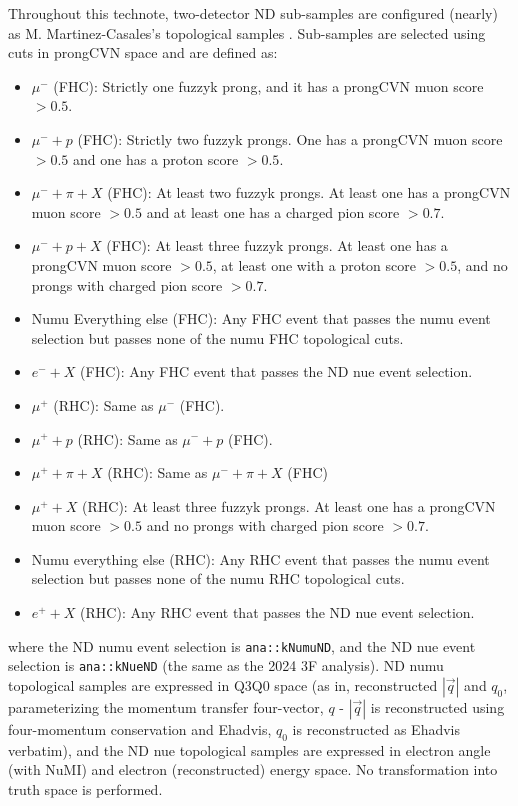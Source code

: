 \documentclass{article}
\begin{document}
Throughout this technote, two-detector ND sub-samples are configured (nearly) as M. Martinez-Casales's topological samples \cite{ref:maria_thesis} \cite{ref:topological_samples_technote}. Sub-samples are selected using cuts in prongCVN space and are defined as:
\begin{itemize}
  \item $\mu^-$ (FHC): Strictly one fuzzyk prong, and it has a prongCVN muon score $> 0.5$.
  \item $\mu^- + p$ (FHC): Strictly two fuzzyk prongs. One has a prongCVN muon score $> 0.5$ and one has a proton score $> 0.5$.
  \item $\mu^- + \pi + X$ (FHC): At least two fuzzyk prongs. At least one has a prongCVN muon score $>0.5$ and at least one has a charged pion score $> 0.7$.
  \item $\mu^- + p + X$ (FHC): At least three fuzzyk prongs. At least one has a prongCVN muon score $>0.5$, at least one with a proton score $> 0.5$, and no prongs with charged pion score $>0.7$.
  \item Numu Everything else (FHC): Any FHC event that passes the numu event selection but passes none of the numu FHC topological cuts.
  \item $e^- + X$ (FHC): Any FHC event that passes the ND nue event selection.
  \item $\mu^+$ (RHC): Same as $\mu^-$ (FHC).
  \item $\mu^+ + p$ (RHC): Same as $\mu^- + p$ (FHC).
  \item $\mu^+ + \pi + X$ (RHC): Same as $\mu^- + \pi + X$ (FHC)
  \item $\mu^+ + X$ (RHC): At least three fuzzyk prongs. At least one has a prongCVN muon score $>0.5$ and no prongs with charged pion score $>0.7$.
  \item Numu everything else (RHC): Any RHC event that passes the numu event selection but passes none of the numu RHC topological cuts.
  \item $e^+ + X$ (RHC): Any RHC event that passes the ND nue event selection.
\end{itemize}
where the ND numu event selection is \texttt{ana::\-kNumu\-ND}, and the ND nue event selection is \texttt{ana::\-kNue\-ND} (the same as the 2024 3F analysis). ND numu topological samples are expressed in Q3Q0 space (as in, reconstructed $|\vec{q}|$ and $q_0$, parameterizing the momentum transfer four-vector, $q$ - $|\vec{q}|$ is reconstructed using four-momentum conservation and Ehadvis, $q_0$ is reconstructed as Ehadvis verbatim), and the ND nue topological samples are expressed in electron angle (with NuMI) and electron (reconstructed) energy space. No transformation into truth space is performed.
\end{document}
